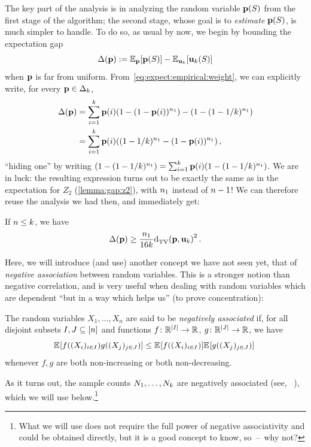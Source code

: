 The key part of the analysis is in analyzing the random variable $\mathbf{p}(S)$ from the first stage of the algorithm; the second stage, whose goal is to \emph{estimate} $\mathbf{p}(S)$, is much simpler to handle. To do so, as usual by now, we begin by bounding the expectation gap
\begin{equation}
    \Delta(\p) \eqdef \bE{\p}{\p(S)} - \bE{\uniform_\ab}{\uniform_\ab(S)}
\end{equation}
when $\mathbf{p}$ is far from uniform. From~\cref{eq:expect:empirical:weight}, we can explicitly write, for every $\mathbf{p}\in\Delta_{k}$,
\begin{align*}
  \Delta(\p) 
  &= \sum_{i=1}^\ab \p(i) (1-(1-\p(i))^{\nss}) - \Paren{1-(1-1/\ab)^{\nss}} \\
  &= \sum_{i=1}^\ab \p(i) \Paren{ (1-1/\ab)^{\nss} - (1-\p(i))^{\nss} }\,,
\end{align*}
``hiding one'' by writing $\Paren{1-(1-1/\ab)^{\nss}} = \sum_{i=1}^\ab \p(i)\Paren{1-(1-1/\ab)^{\nss}}$. We are in luck: the resulting expression turns out to be exactly the same as in the expectation for $Z_2$ (\cref{lemma:gap:z2}), with $n_1$ instead of $n-1$! We can therefore reuse the analysis we had then, and immediately get:
\begin{lemma}
  \label{lemma:gap:z7}
If $n \leq k$, we have
\[
    \Delta(\p) \geq \frac{\nss}{16\ab}\totalvardist{\p}{\uniform_\ab}^2\,.
\]
\end{lemma}
Here, we will introduce (and use) another concept we have not seen yet, that of \emph{negative association} between random variables. This is a stronger notion than negative correlation, and is very useful when dealing with random variables which are dependent ``but in a way which helps us'' (to prove concentration):
\begin{definition}
\label{def:negative:association}
The random variables $X_1,\dots, X_n$ are said to be \emph{negatively associated} if, for all disjoint subsets $I,J\subseteq [n]$ and functions $f\colon \mathbb{R}^{|I|} \to \mathbb{R}$, $g\colon \mathbb{R}^{|J|} \to \mathbb{R}$, we have
\[
    \bEE{f((X_i)_{i\in I})g((X_j)_{j\in J})} \leq \bEE{f((X_i)_{i\in I})}\bEE{g((X_j)_{j\in J})} \
\]
whenever $f,g$ are both non-increasing or both non-decreasing. 
\end{definition}
As it turns out, the sample counts $N_1,\dots,N_k$ are negatively associated (see, \eg~\citep[Section~2.2]{DubhashiR98}), which we will use below.\footnote{What we will use does not require the full power of negative associativity and could be obtained directly, but it is a good concept to know, so~--~why not?} 
